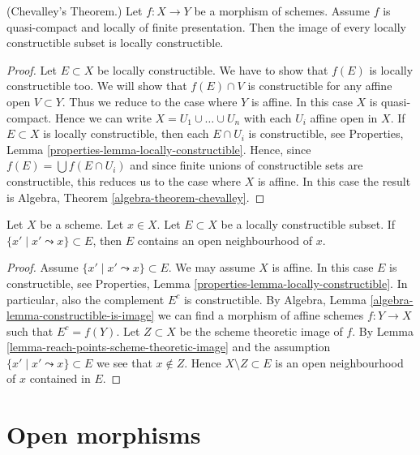\begin{theorem}
\label{theorem-chevalley}
(Chevalley's Theorem.)
Let $f : X \to Y$ be a morphism of schemes.
Assume $f$ is quasi-compact and locally of finite presentation.
Then the image of every locally constructible subset is locally constructible.
\end{theorem}

\begin{proof}
Let $E \subset X$ be locally constructible.
We have to show that $f(E)$ is locally constructible too.
We will show that $f(E) \cap V$ is constructible for any affine
open $V \subset Y$. Thus we reduce to the case where $Y$ is affine.
In this case $X$ is quasi-compact. Hence we can write
$X = U_1 \cup \ldots \cup U_n$ with each $U_i$ affine open in $X$.
If $E \subset X$ is locally constructible, then each $E \cap U_i$
is constructible, see
Properties, Lemma \ref{properties-lemma-locally-constructible}.
Hence, since $f(E) = \bigcup f(E \cap U_i)$ and since finite unions of
constructible sets are constructible, this reduces us to the case where $X$
is affine. In this case the result is
Algebra, Theorem \ref{algebra-theorem-chevalley}.
\end{proof}

\begin{lemma}
\label{lemma-constructible-containing-open}
Let $X$ be a scheme. Let $x \in X$. Let $E \subset X$ be a locally
constructible subset. If $\{x' \mid x' \leadsto x\} \subset E$,
then $E$ contains an open neighbourhood of $x$.
\end{lemma}

\begin{proof}
Assume $\{x' \mid x' \leadsto x\} \subset E$.
We may assume $X$ is affine.
In this case $E$ is constructible, see
Properties, Lemma \ref{properties-lemma-locally-constructible}.
In particular, also the complement $E^c$ is constructible. By
Algebra, Lemma \ref{algebra-lemma-constructible-is-image}
we can find a morphism of affine schemes $f : Y \to X$ such that
$E^c = f(Y)$. Let $Z \subset X$ be the scheme theoretic image of $f$. By
Lemma \ref{lemma-reach-points-scheme-theoretic-image}
and the assumption $\{x' \mid x' \leadsto x\} \subset E$
we see that $x \not \in Z$. Hence $X \setminus Z \subset E$ is an
open neighbourhood of $x$ contained in $E$.
\end{proof}




\section{Open morphisms}
\label{section-open}

